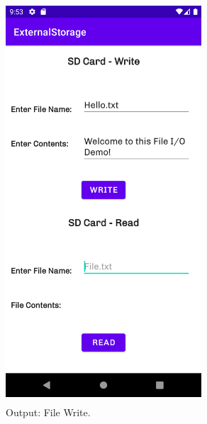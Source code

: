 \documentclass[12pt, a4]{article}
\begin{document}
\subsection*{}
\begin{figure}[h]
\centering
\caption{Output: File Write.}
\includegraphics[height=15cm, width=7.3cm]{ExternalStorage/Screenshots/Output-2.png}
\end{figure}

\newpage
\end{document}
